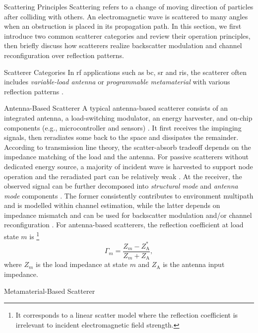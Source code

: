 \documentclass[journal]{IEEEtran}
\begin{document}
\begin{section}{Scattering Principles}
	Scattering refers to a change of moving direction of particles after colliding with others.
	An electromagnetic wave is scattered to many angles when an obstruction is placed in its propagation path.
	In this section, we first introduce two common scatterer categories and review their operation principles, then briefly discuss how scatterers realize backscatter modulation and channel reconfiguration over reflection patterns.
	\begin{subsection}{Scatterer Categories}
		In \gls{rf} applications such as \gls{bc}, \gls{sr} and \gls{ris}, the scatterer often includes \emph{variable-load antenna} or \emph{programmable metamaterial} with various reflection patterns \cite{Liang2022}.
		\begin{subsubsection}{Antenna-Based Scatterer}
			A typical antenna-based scatterer consists of an integrated antenna, a load-switching modulator, an energy harvester, and on-chip components (e.g., microcontroller and sensors) \cite{Dobkin2012}.
			It first receives the impinging signals, then reradiates some back to the space and dissipates the remainder.
			According to transmission line theory, the scatter-absorb tradeoff depends on the impedance matching of the load and the antenna.
			For passive scatterers without dedicated energy source, a majority of incident wave is harvested to support node operation and the reradiated part can be relatively weak \cite{Thomas2012a}.
			At the receiver, the observed signal can be further decomposed into \emph{structural mode} and \emph{antenna mode} components \cite{Hansen1989}.
			The former consistently contributes to environment multipath and is modelled within channel estimation, while the latter depends on impedance mismatch and can be used for backscatter modulation \cite{Boyer2014} and/or channel reconfiguration \cite{Liang2022}.
			For antenna-based scatterers, the reflection coefficient at load state $m$ is%
			\footnote{It corresponds to a linear scatter model where the reflection coefficient is irrelevant to incident electromagnetic field strength.}
			\begin{equation}
				\Gamma_m = \frac{Z_m - Z_{\mathrm{A}}^*}{Z_m + Z_{\mathrm{A}}},
				\label{eq:reflection_pattern_antenna}
			\end{equation}
			where $Z_m$ is the load impedance at state $m$ and $Z_{\mathrm{A}}$ is the antenna input impedance.
		\end{subsubsection}
		\begin{subsubsection}{Metamaterial-Based Scatterer}

\end{subsubsection}
\end{subsection}
\end{section}
\end{document}
